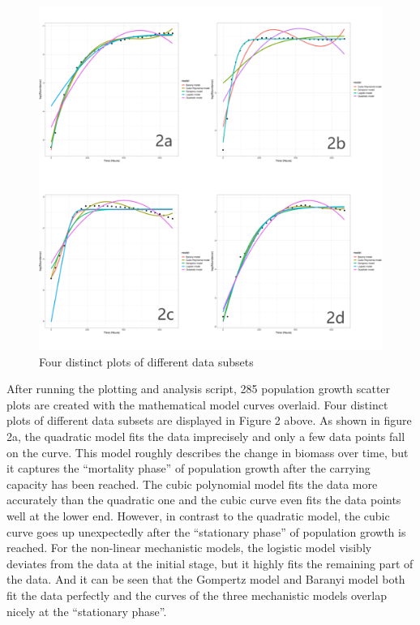 \documentclass[11pt, a4paper]{article}
\begin{document}
\begin{figure}[H]
    \centering
    \includegraphics[width=\textwidth]{figure2}
    \caption{Four distinct plots of different data subsets}
    \label{figure2}
\end{figure}

After running the plotting and analysis script, 285 population growth scatter plots are created with the mathematical model curves overlaid. Four distinct plots of different data subsets are displayed in Figure 2 above. As shown in figure 2a, the quadratic model fits the data imprecisely and only a few data points fall on the curve. This model roughly describes the change in biomass over time, but it captures the “mortality phase” of population growth after the carrying capacity has been reached. The cubic polynomial model fits the data more accurately than the quadratic one and the cubic curve even fits the data points well at the lower end. However, in contrast to the quadratic model, the cubic curve goes up unexpectedly after the “stationary phase” of population growth is reached. For the non-linear mechanistic models, the logistic model visibly deviates from the data at the initial stage, but it highly fits the remaining part of the data. And it can be seen that the Gompertz model and Baranyi model both fit the data perfectly and the curves of the three mechanistic models overlap nicely at the “stationary phase”.  
\end{document}
